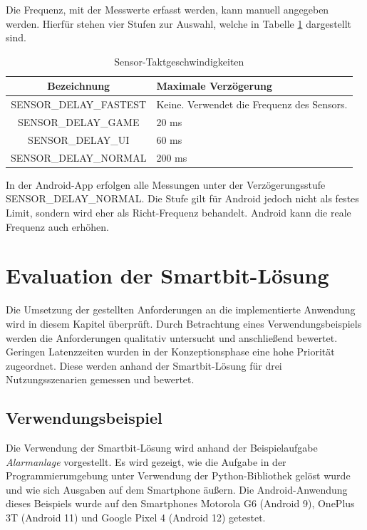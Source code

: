 \documentclass[11pt,a4paper]{report}
\begin{document}
Die Frequenz, mit der Messwerte erfasst werden, kann manuell angegeben werden.
Hierfür stehen vier Stufen zur Auswahl, welche in Tabelle \ref{tab:sensor_speeds} dargestellt sind.
\begin{table}[htbp]
  \centering
  \begin{tabular}{|c|p{4cm}|}
      \hline
      \textbf{Bezeichnung} & \textbf{Maximale Verzögerung} \\
	  \hline
      SENSOR\_DELAY\_FASTEST & Keine. Verwendet die Frequenz des Sensors.\\
      \hline
      SENSOR\_DELAY\_GAME & 20 ms\\
      \hline
      SENSOR\_DELAY\_UI & 60 ms\\
      \hline
      SENSOR\_DELAY\_NORMAL & 200 ms\\
      \hline
  \end{tabular}
  \caption{Sensor-Taktgeschwindigkeiten\cite{sensor-takt}}
  \label{tab:sensor_speeds}
\end{table}
In der Android-App erfolgen alle Messungen unter der Verzögerungsstufe SENSOR\_DELAY\_NORMAL.
Die Stufe gilt für Android jedoch nicht als festes Limit, sondern wird eher als Richt-Frequenz behandelt.
Android kann die reale Frequenz auch erhöhen.

\chapter{Evaluation der Smartbit-Lösung}\label{chap:eval}
Die Umsetzung der gestellten Anforderungen an die implementierte Anwendung wird in diesem Kapitel überprüft.
Durch Betrachtung eines Verwendungsbeispiels werden die Anforderungen qualitativ untersucht und anschließend bewertet.
Geringen Latenzzeiten wurden in der Konzeptionsphase eine hohe Priorität zugeordnet.
Diese werden anhand der Smartbit-Lösung für drei Nutzungsszenarien gemessen und bewertet.

\section{Verwendungsbeispiel}
Die Verwendung der Smartbit-Lösung wird anhand der Beispielaufgabe \textit{Alarmanlage} vorgestellt.
Es wird gezeigt, wie die Aufgabe in der Programmierumgebung unter Verwendung der Python-Bibliothek gelöst wurde und wie sich Ausgaben auf dem Smartphone äußern.
Die Android-Anwendung dieses Beispiels wurde auf den Smartphones Motorola G6 (Android 9), OnePlus 3T (Android 11) und Google Pixel 4 (Android 12) getestet.
\end{document}
